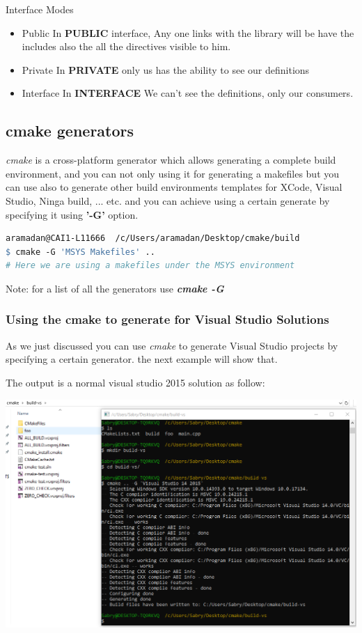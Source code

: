 \documentclass{article}
\begin{document}
Interface Modes
\begin{itemize}
    \item Public
    In \textbf{PUBLIC} interface, Any one links with the library will be have the includes also the all the directives visible to him. 
    \item Private 
    In \textbf{PRIVATE} only us has the ability to see our definitions
    \item Interface 
    In \textbf{INTERFACE} We can't see the definitions, only our consumers.
\end{itemize}

\subsection{cmake generators}
\textit{cmake} is a cross-platform generator which allows generating a complete build environment, and you can not only using it for generating a makefiles but you can use also to generate other build environments templates for XCode, Visual Studio, Ninga build, ... etc.
and you can achieve using a certain generate by specifying it using \textbf{'-G'} option.

\begin{lstlisting}[language=make, caption=Using a specific generator]
aramadan@CAI1-L11666  /c/Users/aramadan/Desktop/cmake/build
$ cmake -G 'MSYS Makefiles' ..
# Here we are using a makefiles under the MSYS environment
\end{lstlisting}

Note: for a list of all the generators use \textit{\textbf{cmake -G}} 

\subsubsection{Using the cmake to generate for Visual Studio Solutions}
As we just discussed you can use \textit{cmake} to generate Visual Studio projects by specifying a certain generator. the next example will show that.


The output is a normal visual studio 2015 solution as follow:

\begin{center}
\includegraphics[scale=0.50]{./resources/imgs/cmake/vs2015-generator.PNG}
\end{center}
\end{document}
